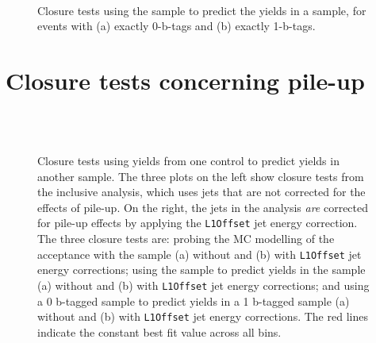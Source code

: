 \newpage
\begin{figure}[!h]
  \begin{center}
     \\
    \caption{Closure tests using the \mj sample to predict the yields in
      a \mmj sample, for events with (a) exactly 0-b-tags and (b)
      exactly 1-b-tags.}
    \label{fig:btag-samples}
  \end{center}
\end{figure}

\newpage
\section{Closure tests concerning pile-up\label{closure-pileup}}

\begin{figure}[!h]
  \begin{center}
     \\
     \\
    \caption{Closure tests using yields from one control to predict
      yields in another sample. The three plots on the left show
      closure tests from the inclusive analysis, which uses jets that
      are not corrected for the effects of pile-up. On the right, the
      jets in the analysis {\it are} corrected for pile-up effects by
      applying the \texttt{L1Offset} jet energy correction. The three
      closure tests are: probing the MC modelling of the \alt
      acceptance with the \mj sample (a) without and (b) with
      \texttt{L1Offset} jet energy corrections; using the \mj sample
      to predict yields in the \mmj sample (a) without and (b) with
      \texttt{L1Offset} jet energy corrections; and using a 0 b-tagged
      \mj sample to predict yields in a 1 b-tagged \mj sample (a)
      without and (b) with \texttt{L1Offset} jet energy
      corrections. The red lines indicate the constant best fit value
      across all \HT bins.}
    \label{fig:closure-pileup}
  \end{center}
\end{figure}

